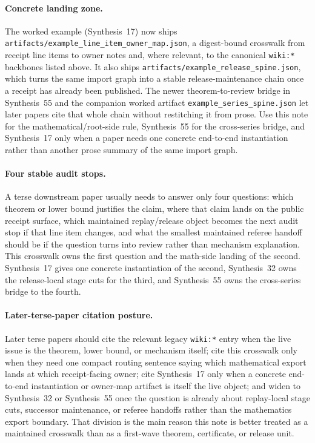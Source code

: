 \documentclass[11pt]{article}
\begin{document}
\paragraph{Concrete landing zone.}
The worked example (Synthesis~17) now ships \texttt{artifacts/example\_line\_item\_owner\_map.json}, a digest-bound crosswalk from receipt line items to owner notes and, where relevant, to the canonical \texttt{wiki:*} backbones listed above.
It also ships \texttt{artifacts/example\_release\_spine.json}, which turns the same import graph into a stable release-maintenance chain once a receipt has already been published. The newer theorem-to-review bridge in Synthesis~55 and the companion worked artifact \texttt{example\_series\_spine.json} let later papers cite that whole chain without restitching it from prose.
Use this note for the mathematical/root-side rule, Synthesis~55 for the cross-series bridge, and Synthesis~17 only when a paper needs one concrete end-to-end instantiation rather than another prose summary of the same import graph.\cite{series:workedexample,series:seriesspines}

\paragraph{Four stable audit stops.}
A terse downstream paper usually needs to answer only four questions: which theorem or lower bound justifies the claim, where that claim lands on the public receipt surface, which maintained replay/release object becomes the next audit stop if that line item changes, and what the smallest maintained referee handoff should be if the question turns into review rather than mechanism explanation. This crosswalk owns the first question and the math-side landing of the second. Synthesis~17 gives one concrete instantiation of the second, Synthesis~32 owns the release-local stage cuts for the third, and Synthesis~55 owns the cross-series bridge to the fourth.\cite{series:workedexample,series:releasespine,series:seriesspines}

\paragraph{Later-terse-paper citation posture.}
Later terse papers should cite the relevant legacy \texttt{wiki:*} entry when the live issue is the theorem, lower bound, or mechanism itself; cite this crosswalk only when they need one compact routing sentence saying which mathematical export lands at which receipt-facing owner; cite Synthesis~17 only when a concrete end-to-end instantiation or owner-map artifact is itself the live object; and widen to Synthesis~32 or Synthesis~55 once the question is already about replay-local stage cuts, successor maintenance, or referee handoffs rather than the mathematics export boundary. That division is the main reason this note is better treated as a maintained crosswalk than as a first-wave theorem, certificate, or release unit.\cite{series:workedexample,series:releasespine,series:seriesspines}
\end{document}
